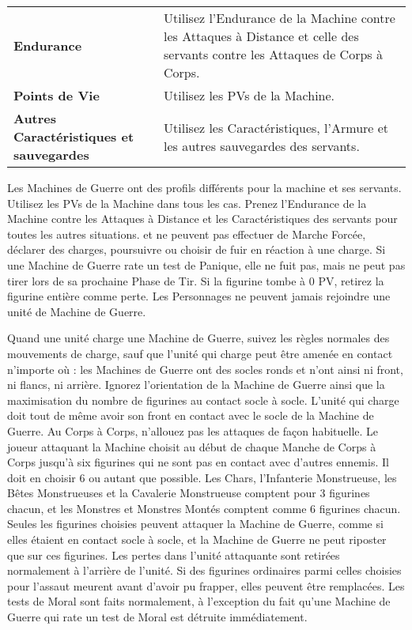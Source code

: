 \renewcommand{\arraystretch}{2.5}
\begin{center}
\begin{tabular}{>{\bfseries\raggedleft}p{4.5cm}p{10.5cm}}
\hline
Endurance & Utilisez l'Endurance de la Machine contre les Attaques à Distance et celle des servants contre les Attaques de Corps à Corps. \tabularnewline
Points de Vie & Utilisez les PVs de la Machine. \tabularnewline
Autres Caractéristiques et sauvegardes & Utilisez les Caractéristiques, l'Armure et les autres sauvegardes des servants. \tabularnewline
\hline
\end{tabular}\end{center}
\renewcommand{\arraystretch}{1.5}

Les Machines de Guerre ont des profils différents pour la machine et ses servants. Utilisez les PVs de la Machine dans tous les cas. Prenez l'Endurance de la Machine contre les Attaques à Distance et les Caractéristiques des servants pour toutes les autres situations.  et ne peuvent pas effectuer de Marche Forcée, déclarer des charges, poursuivre ou choisir de fuir en réaction à une charge. Si une Machine de Guerre rate un test de Panique, elle ne fuit pas, mais ne peut pas tirer lors de sa prochaine Phase de Tir. Si la figurine tombe à 0 PV, retirez la figurine entière comme perte. Les Personnages ne peuvent jamais rejoindre une unité de Machine de Guerre.

Quand une unité charge une Machine de Guerre, suivez les règles normales des mouvements de charge, sauf que l'unité qui charge peut être amenée en contact n'importe où : les Machines de Guerre ont des socles ronds et n'ont ainsi ni front, ni flancs, ni arrière. Ignorez l'orientation de la Machine de Guerre ainsi que la maximisation du nombre de figurines au contact socle à socle. L'unité qui charge doit tout de même avoir son front en contact avec le socle de la Machine de Guerre.  Au Corps à Corps, n'allouez pas les attaques de façon habituelle. Le joueur attaquant la Machine choisit au début de chaque Manche de Corps à Corps jusqu'à six figurines qui ne sont pas en contact avec d'autres ennemis. Il doit en choisir 6 ou autant que possible. Les Chars, l'Infanterie Monstrueuse, les Bêtes Monstrueuses et la Cavalerie Monstrueuse comptent pour 3 figurines chacun, et les Monstres et Monstres Montés comptent comme 6 figurines chacun. Seules les figurines choisies peuvent attaquer la Machine de Guerre, comme si elles étaient en contact socle à socle, et la Machine de Guerre ne peut riposter que sur ces figurines. Les pertes dans l'unité attaquante sont retirées normalement à l'arrière de l'unité. Si des figurines ordinaires parmi celles choisies pour l'assaut meurent avant d'avoir pu frapper, elles peuvent être remplacées. Les tests de Moral sont faits normalement, à l'exception du fait qu'une Machine de Guerre qui rate un test de Moral est détruite immédiatement.

